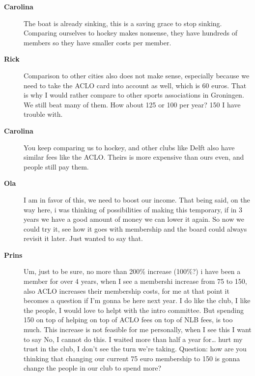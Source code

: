 \documentclass[12pt, a4paper]{article}
\newcommand{\speak}[2]{\begin{description}\item[\textbf{#1}]#2\end{description}}
\begin{document}
\speak{Carolina}{The boat is already sinking, this is a saving grace to stop sinking. Comparing ourselves to hockey makes nonsense, they have hundreds of members so they have smaller costs per member.}

\speak{Rick}{Comparison to other cities also does not make sense, especially because we need to take the ACLO card into account as well, which is 60 euros. That is why I would rather compare to other sports associations in Groningen. We still beat many of them. How about 125 or 100 per year? 150 I have trouble with.}

\speak{Carolina}{You keep comparing us to hockey, and other clubs like Delft also have similar fees like the ACLO. Theirs is more expensive than ours even, and people still pay them.}

\speak{Ola}{I am in favor of this, we need to boost our income. That being said, on the way here, i was thinking of possibilities of making this temporary, if in 3 years we have a good amount of money we can lower it again. So now we could try it, see how it goes with membership and the board could always revisit it later. Just wanted to say that.}

\speak{Prins}{Um, just to be sure, no more than 200\% increase (100\%?) i have been a member for over 4 years, when I see a membershi increase from 75 to 150, also ACLO increases their membership costs, for me at that point it becomes a question if I'm gonna be here next year. I do like the club, I like the people, I would love to helpt with the intro committee. But spending 150 on top of helping on top of ACLO fees on top of NLB fees, is too much. This increase is not feasible for me personally, when I see this I want to say No, I cannot do this. I waited more than half a year for… hurt my trust in the club, I don't see the turn we're taking.
Question: how are you thinking that changing our current 75 euro membership to 150 is gonna change the people in our club to spend more?}



\end{document}
